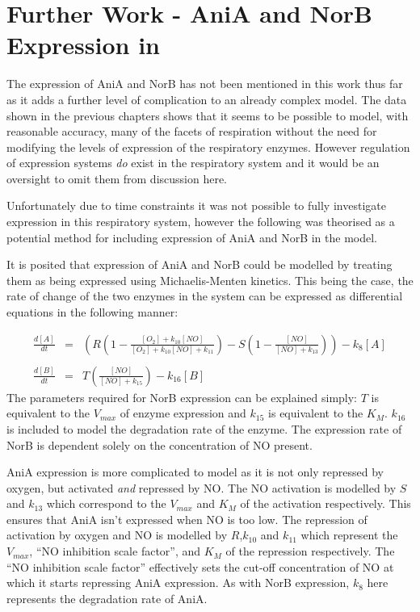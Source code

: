 \chapter[AniA and NorB Expression in \Nm{}]{Further Work - AniA and NorB Expression in \Nm{}}
\label{chap:expression}
The expression of AniA and NorB has not been mentioned in this work thus far as it adds a further level of complication to an already complex model. The data shown in the previous chapters shows that it seems to be possible to model, with reasonable accuracy, many of the facets of respiration without the need for modifying the levels of expression of the respiratory enzymes. However regulation of expression systems \textit{do} exist in the respiratory system and it would be an oversight to omit them from discussion here.

Unfortunately due to time constraints it was not possible to fully investigate expression in this respiratory system, however the following was theorised as a potential method for including expression of AniA and NorB in the model.

It is posited that expression of AniA and NorB could be modelled by treating them as being expressed using Michaelis-Menten kinetics. This being the case, the rate of change of the two enzymes in the system can be expressed as differential equations in the following manner:

\begin{eqnarray*}
\frac{d[A]}{dt} & = & \left(R\left(1 - \frac{[O_2] + k_{10}[NO]}{[O_2] + k_{10}[NO] + k_{11}}\right) - S\left(1 - \frac{[NO]}{[NO] + k_{13}}\right)\right) - k_8[A] \nonumber \\ \\
\frac{d[B]}{dt} & = & T \left(\frac{[NO]}{[NO] + k_{15}}\right) - k_{16}[B]
\end{eqnarray*}
The parameters required for NorB expression can be explained simply: $T$ is equivalent to the $V_{max}$ of enzyme expression and $k_{15}$ is equivalent to the $K_M$. $k_{16}$ is included to model the degradation rate of the enzyme. The expression rate of NorB is dependent solely on the concentration of NO present.

AniA expression is more complicated to model as it is not only repressed by oxygen, but activated \textit{and} repressed by NO. The NO activation is modelled by $S$ and $k_{13}$ which correspond to the $V_{max}$ and $K_M$ of the activation respectively. This ensures that AniA isn't expressed when NO is too low. The repression of activation by oxygen and NO is modelled by $R$,$k_{10}$ and $k_{11}$ which represent the $V_{max}$, ``NO inhibition scale factor'', and $K_M$ of the repression respectively. The ``NO inhibition scale factor'' effectively sets the cut-off concentration of NO at which it starts repressing AniA expression. As with NorB expression, $k_8$ here represents the degradation rate of AniA.

